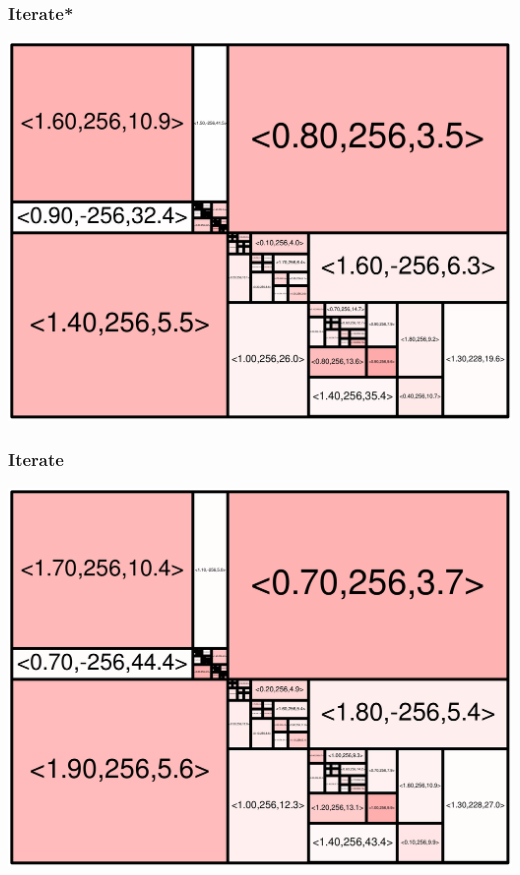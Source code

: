 \begin{frame}
\frametitle{Iterate\hspace{10 cm}*}\begin{centering}\includegraphics[width=8.5 cm]{remy-graph/graph/test87.pdf}

\end{centering}\end{frame}


\begin{frame}
\frametitle{Iterate}\begin{centering}\includegraphics[width=8.5 cm]{remy-graph/graph/test88.pdf}

\end{centering}\end{frame}
